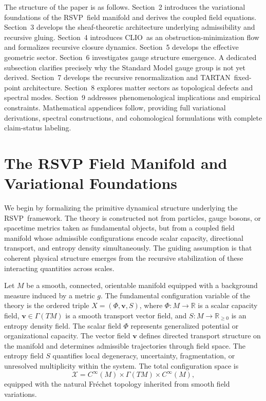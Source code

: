 \documentclass[12pt,a4paper]{article}
\newcommand{\RSVP}{\textrm{RSVP}}
\newcommand{\CLIO}{\textrm{CLIO}}
\newcommand{\TARTAN}{\textrm{TARTAN}}
\newcommand{\Field}{\mathcal{X}}
\newcommand{\R}{\mathbb{R}}
\begin{document}
The structure of the paper is as follows. Section~2 introduces the variational
foundations of the \RSVP\ field manifold and derives the coupled field equations.
Section~3 develops the sheaf-theoretic architecture underlying admissibility and
recursive gluing. Section~4 introduces \CLIO\ as an obstruction-minimization
flow and formalizes recursive closure dynamics. Section~5 develops the effective
geometric sector. Section~6 investigates gauge structure emergence. A dedicated
subsection clarifies precisely why the Standard Model gauge group is not yet
derived. Section~7 develops the recursive renormalization and \TARTAN\ fixed-point
architecture. Section~8 explores matter sectors as topological defects and
spectral modes. Section~9 addresses phenomenological implications and empirical
constraints. Mathematical appendices follow, providing full variational
derivations, spectral constructions, and cohomological formulations with
complete claim-status labeling.

\section{The RSVP Field Manifold and Variational Foundations}

We begin by formalizing the primitive dynamical structure underlying the \RSVP\
framework. The theory is constructed not from particles, gauge bosons, or
spacetime metrics taken as fundamental objects, but from a coupled field manifold
whose admissible configurations encode scalar capacity, directional transport,
and entropy density simultaneously. The guiding assumption is that coherent
physical structure emerges from the recursive stabilization of these interacting
quantities across scales.

Let $M$ be a smooth, connected, orientable manifold equipped with a background
measure induced by a metric $g$. The fundamental configuration variable of the
theory is the ordered triple $X=(\Phi,\mathbf{v},S)$, where $\Phi : M \to \R$
is a scalar capacity field, $\mathbf{v} \in \Gamma(TM)$ is a smooth transport
vector field, and $S : M \to \R_{\geq 0}$ is an entropy density field. The
scalar field $\Phi$ represents generalized potential or organizational capacity.
The vector field $\mathbf{v}$ defines directed transport structure on the
manifold and determines admissible trajectories through field space. The entropy
field $S$ quantifies local degeneracy, uncertainty, fragmentation, or unresolved
multiplicity within the system. The total configuration space is
\[
\Field = C^\infty(M)\times\Gamma(TM)\times C^\infty(M),
\]
equipped with the natural Fr\'{e}chet topology inherited from smooth field
variations.
\end{document}
